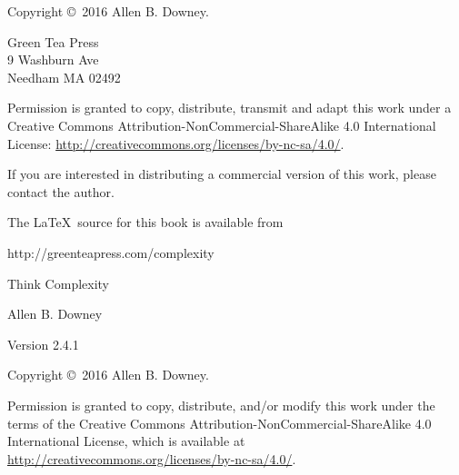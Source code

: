 \documentclass[12pt]{book}
\newcommand{\thetitle}{Think Complexity}
\newcommand{\theauthors}{Allen B. Downey}
\newcommand{\theversion}{2.4.1}
\theoremstyle{exercise}
\begin{document}
\begin{latexonly}
\begin{flushright}
\vfill

\end{flushright}


\pagebreak
\thispagestyle{empty}

Copyright \copyright ~2016 \theauthors.



\vspace{0.2in}

\begin{flushleft}
Green Tea Press       \\
9 Washburn Ave \\
Needham MA 02492
\end{flushleft}

Permission is granted to copy, distribute, transmit and adapt
this work under a Creative Commons
Attribution-NonCommercial-ShareAlike 4.0 International License:
\url{http://creativecommons.org/licenses/by-nc-sa/4.0/}.

If you are interested in distributing a commercial version of this
work, please contact the author.

The \LaTeX\ source for this book is available from

\begin{code}
      http://greenteapress.com/complexity
\end{code}


\cleardoublepage
\setcounter{tocdepth}{1}
\tableofcontents

\end{latexonly}



\begin{htmlonly}

\vspace{1em}

{\Large \thetitle}

{\large \theauthors}

Version \theversion

\vspace{1em}

Copyright \copyright ~2016 \theauthors.

Permission is granted to copy, distribute, and/or modify this work
under the terms of the Creative Commons
Attribution-NonCommercial-ShareAlike 4.0 International License, which is
available at \url{http://creativecommons.org/licenses/by-nc-sa/4.0/}.

\vspace{1em}

\setcounter{chapter}{-1}

\end{htmlonly}
\end{document}
